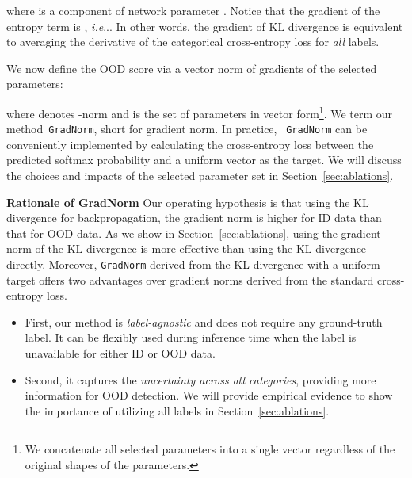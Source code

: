 \documentclass{article}
\makeatletter
\DeclareRobustCommand\onedot{\futurelet\@let@token\@onedot}
\def\@onedot{\ifx\@let@token.\else.\null\fi\xspace}
\def\ie{\emph{i.e}\onedot} \def\Ie{\emph{I.e}\onedot}
\makeatother
\begin{document}
where  is a component of network parameter . Notice that the gradient of the entropy term is , \ie . In other words, the gradient of KL divergence is equivalent to averaging the derivative of the categorical cross-entropy loss for \emph{all} labels.

We now define the OOD score via a vector norm of gradients of the selected parameters:

where  denotes -norm and  is the set of   parameters in vector form\footnote{We concatenate all selected parameters into a single vector regardless of the original shapes of the parameters.}. We term our method~\texttt{GradNorm}, short for gradient norm. In practice, ~\texttt{GradNorm} can be conveniently implemented by calculating the cross-entropy loss between the predicted softmax probability and a uniform vector as the target. We will discuss the choices and impacts of the selected parameter set  in Section~\ref{sec:ablations}. 











\textbf{Rationale of {GradNorm}} Our operating hypothesis is that using the KL divergence for backpropagation, the gradient norm is higher for ID data than that for OOD data. As we show in Section~\ref{sec:ablations}, using the gradient norm of the KL divergence is more effective than using the KL divergence directly.
Moreover, \texttt{GradNorm} derived from the KL divergence with a uniform target offers two advantages over gradient norms derived from the standard cross-entropy loss.
\vspace{-0.2cm}
\begin{itemize}
\itemsep0em
    \item First, our method is \emph{label-agnostic} and does not require any ground-truth label. It can be flexibly used during inference time when the label is unavailable for either ID or OOD data. 
    \item  Second, it captures the \emph{uncertainty across all categories}, providing more information for OOD detection. We will provide empirical evidence to show the importance of utilizing all labels in Section~\ref{sec:ablations}.
\end{itemize}
\end{document}
